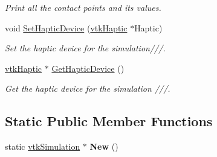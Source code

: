 \begin{DoxyCompactItemize}
\begin{DoxyCompactList}\small\item\em Print all the contact points and its values. \item\end{DoxyCompactList}\item 
\hypertarget{classvtkSimulation_a1071d2cbaa5744869054516946e8d1e0}{
void \hyperlink{classvtkSimulation_a1071d2cbaa5744869054516946e8d1e0}{SetHapticDevice} (\hyperlink{classvtkHaptic}{vtkHaptic} $\ast$Haptic)}
\label{classvtkSimulation_a1071d2cbaa5744869054516946e8d1e0}

\begin{DoxyCompactList}\small\item\em Set the haptic device for the simulation///. \item\end{DoxyCompactList}\item 
\hypertarget{classvtkSimulation_a50c3e6a8584c6e807cf649541b1096ae}{
\hyperlink{classvtkHaptic}{vtkHaptic} $\ast$ \hyperlink{classvtkSimulation_a50c3e6a8584c6e807cf649541b1096ae}{GetHapticDevice} ()}
\label{classvtkSimulation_a50c3e6a8584c6e807cf649541b1096ae}

\begin{DoxyCompactList}\small\item\em Get the haptic device for the simulation ///. \item\end{DoxyCompactList}\end{DoxyCompactItemize}
\subsection*{Static Public Member Functions}
\begin{DoxyCompactItemize}
\item 
\hypertarget{classvtkSimulation_a7a01eece6a34fb90b64f93e32c7b9d46}{
static \hyperlink{classvtkSimulation}{vtkSimulation} $\ast$ {\bfseries New} ()}
\label{classvtkSimulation_a7a01eece6a34fb90b64f93e32c7b9d46}

\end{DoxyCompactItemize}
